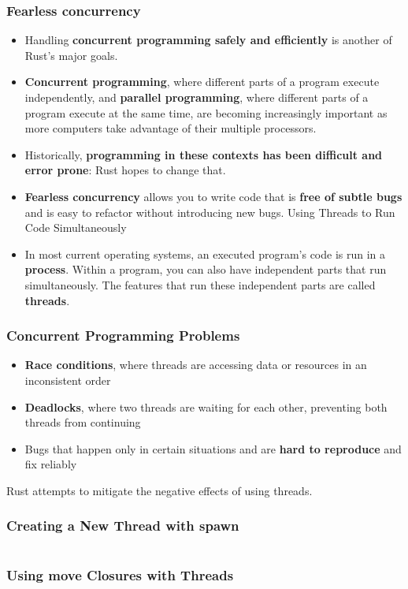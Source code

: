 \documentclass{beamer}
\begin{document}
\begin{frame}[fragile]
	\frametitle{Fearless concurrency}
	\begin{itemize}
		\item Handling \textbf{concurrent programming safely and efficiently }is another of Rust’s major goals. 
		\item \textbf{Concurrent programming}, where different parts of a program execute independently, and \textbf{parallel programming}, where different parts of a program execute at the same time, are becoming increasingly important as more computers take advantage of their multiple processors. 
		\item 	Historically, \textbf{programming in these contexts has been difficult and error prone}: Rust hopes to change that.
		\item \textbf{Fearless concurrency} allows you to write code that is \textbf{free of subtle bugs} and is easy to refactor without introducing new bugs.
		Using Threads to Run Code Simultaneously
	\item In most current operating systems, an executed program’s code is run in a \textbf{process}. Within a program, you can also have independent parts that run simultaneously. The features that run these independent parts are called \textbf{threads}. 
	\end{itemize}
\end{frame} 


\begin{frame}[fragile]
	\frametitle{Concurrent Programming Problems}
\begin{itemize}
	\item \textbf{Race conditions}, where threads are accessing data or resources in an inconsistent order
	\item \textbf{Deadlocks}, where two threads are waiting for each other, preventing both threads from continuing
	\item Bugs that happen only in certain situations and are \textbf{hard to reproduce} and fix reliably
\end{itemize}

Rust attempts to mitigate the negative effects of using threads.
\end{frame} 

\begin{frame}[fragile]
	\frametitle{Creating a New Thread with spawn}
	\inputminted{rust}{./code/thread1.rs}
\end{frame}


\begin{frame}[fragile]
	\frametitle{Using move Closures with Threads}
	\inputminted{rust}{./code/thread2.rs}
\end{frame}
\end{document}
